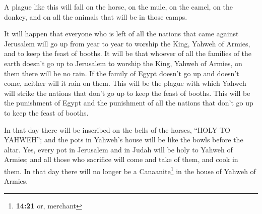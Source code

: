  A plague like this will fall on the horse, on the mule,
on the camel, on the donkey, and on all the animals that will be in
those camps.

 It will happen that everyone who is left of all the
nations that came against Jerusalem will go up from year to year to
worship the King, Yahweh of Armies, and to keep the feast of booths.
 It will be that whoever of all the families of the earth
doesn't go up to Jerusalem to worship the King, Yahweh of Armies, on
them there will be no rain.  If the family of Egypt
doesn't go up and doesn't come, neither will it rain on them. This will
be the plague with which Yahweh will strike the nations that don't go up
to keep the feast of booths.  This will be the punishment
of Egypt and the punishment of all the nations that don't go up to keep
the feast of booths.

 In that day there will be inscribed on the bells of the
horses, ``HOLY TO YAHWEH''; and the pots in Yahweh's house will be like
the bowls before the altar.  Yes, every pot in Jerusalem
and in Judah will be holy to Yahweh of Armies; and all those who
sacrifice will come and take of them, and cook in them. In that day
there will no longer be a Canaanite\footnote{\textbf{14:21} or, merchant}
in the house of Yahweh of Armies.
